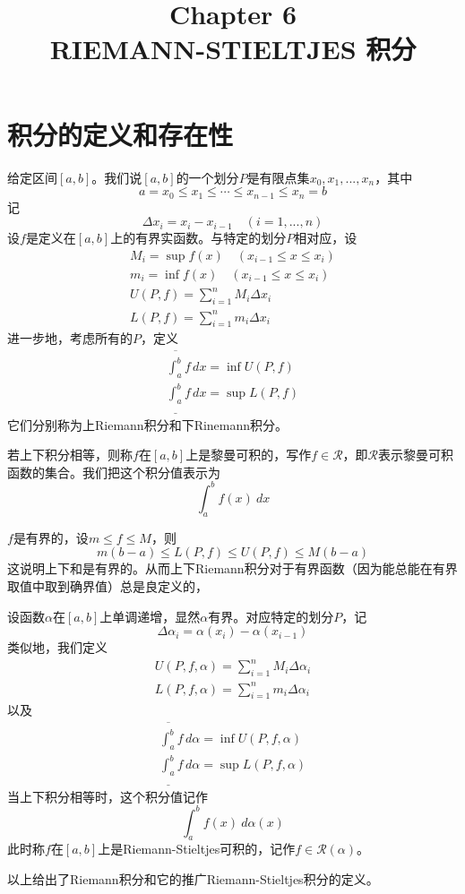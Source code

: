 \documentclass{article}
\title{\Huge \textbf{Chapter 6}\\
RIEMANN-STIELTJES 积分}
\date{}
\newcommand{\sR}{\mathscr R}
\begin{document}
\maketitle
\section{积分的定义和存在性}

\begin{definition}
    给定区间\([a,b]\)。我们说\([a,b]\)的一个划分\(P\)是有限点集\(x_0,x_1,...,x_n\)，其中\[
    a=x_0\leq x_1\leq \cdots\leq x_{n-1}\leq x_n=b
    \]记\[\Delta x_i=x_i-x_{i-1} \quad(i=1,...,n)\]
    设\(f\)是定义在\([a,b]\)上的有界实函数。与特定的划分\(P\)相对应，设\begin{gather*}
        M_i=\sup f(x) \quad(x_{i-1}\leq x\leq x_i)\\
        m_i =\inf f(x)\quad(x_{i-1}\leq x\leq x_i)\\
        U(P,f)=\sum_{i=1}^n M_i\Delta x_i\\
        L(P,f)=\sum_{i=1}^nm_i\Delta x_i
    \end{gather*}
    进一步地，考虑所有的\(P\)，定义\begin{gather*} 
\overline{\int_a^b} f \, dx=   \inf U(P,f)\\
\underline{\int_a^b} f \, dx=\sup L(P,f)
    \end{gather*}
它们分别称为上Riemann积分和下Rinemann积分。

若上下积分相等，则称\(f\)在\([a,b]\)上是黎曼可积的，写作\(f\in \mathscr R\)，即\(\sR\)表示黎曼可积函数的集合。我们把这个积分值表示为\[
\int_a^b f(x)~dx
\]

\end{definition}

\begin{remark}
    \(f\)是有界的，设\(m\leq f\leq M\)，则\[
    m(b-a)\leq L(P,f)\leq U(P,f)\leq M(b-a)
    \]这说明上下和是有界的。从而上下Riemann积分对于有界函数（因为能总能在有界取值中取到确界值）总是良定义的，
\end{remark}

\begin{definition}
    设函数\(\alpha\)在\([a,b]\)上单调递增，显然\(\alpha\)有界。对应特定的划分\(P\)，记\[
    \Delta \alpha_i=\alpha(x_i)-\alpha(x_{i-1})
    \]
    类似地，我们定义\begin{gather*}
    U(P,f,\alpha)=\sum_{i=1}^nM_i\Delta\alpha_i\\
    L(P,f,\alpha)=\sum_{i=1}^n m_i \Delta\alpha_i
    \end{gather*}
    以及\begin{gather*} 
\overline{\int_a^b} f \, d\alpha =   \inf U(P,f,\alpha)\\
\underline{\int_a^b} f \, d\alpha   =\sup L(P,f,\alpha)
    \end{gather*}
    当上下积分相等时，这个积分值记作\[
    \int_a^b f(x)~d\alpha(x)
    \]
    此时称\(f\)在\([a,b]\)上是Riemann-Stieltjes可积的，记作\(f\in \sR(\alpha)\)。
\end{definition}
以上给出了Riemann积分和它的推广Riemann-Stieltjes积分的定义。
\end{document}
